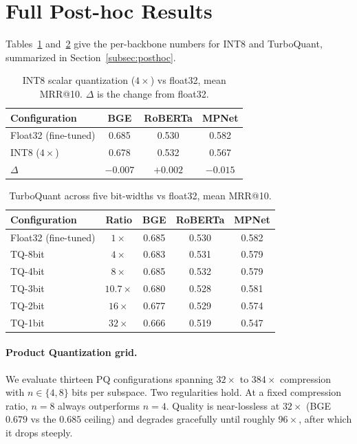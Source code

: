 \section{Full Post-hoc Results}
\label{app:posthoc}
Tables~\ref{tab:int8full} and~\ref{tab:tqfull} give the per-backbone numbers for
INT8 and TurboQuant, summarized in Section~\ref{subsec:posthoc}.

\begin{table}[h]
  \centering
  \caption{INT8 scalar quantization ($4\times$) vs float32, mean MRR@10.
  $\Delta$ is the change from float32.}
  \label{tab:int8full}
  \begin{tabular}{lccc}
    \toprule
    \textbf{Configuration} & \textbf{BGE} & \textbf{RoBERTa} & \textbf{MPNet} \\
    \midrule
    Float32 (fine-tuned) & 0.685 & 0.530 & 0.582 \\
    INT8 ($4\times$)     & 0.678 & 0.532 & 0.567 \\
    $\Delta$             & $-0.007$ & $+0.002$ & $-0.015$ \\
    \bottomrule
  \end{tabular}
\end{table}

\begin{table}[h]
  \centering
  \caption{TurboQuant across five bit-widths vs float32, mean MRR@10.}
  \label{tab:tqfull}
  \begin{tabular}{lcccc}
    \toprule
    \textbf{Configuration} & \textbf{Ratio} & \textbf{BGE} & \textbf{RoBERTa} & \textbf{MPNet} \\
    \midrule
    Float32 (fine-tuned) & $1\times$    & 0.685 & 0.530 & 0.582 \\
    TQ-8bit              & $4\times$    & 0.683 & 0.531 & 0.579 \\
    TQ-4bit              & $8\times$    & 0.685 & 0.532 & 0.579 \\
    TQ-3bit              & $10.7\times$ & 0.680 & 0.528 & 0.581 \\
    TQ-2bit              & $16\times$   & 0.677 & 0.529 & 0.574 \\
    TQ-1bit              & $32\times$   & 0.666 & 0.519 & 0.547 \\
    \bottomrule
  \end{tabular}
\end{table}

\paragraph{Product Quantization grid.}
We evaluate thirteen PQ configurations spanning $32\times$ to $384\times$
compression with $n \in \{4, 8\}$ bits per subspace. Two regularities hold. At a
fixed compression ratio, $n=8$ always outperforms $n=4$. Quality is
near-lossless at $32\times$ (BGE $0.679$ vs the $0.685$ ceiling) and degrades
gracefully until roughly $96\times$, after which it drops steeply.

